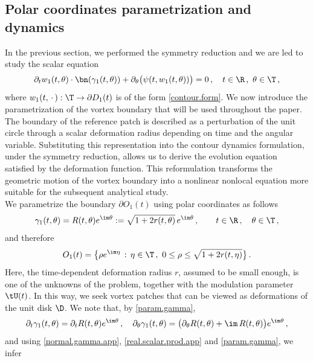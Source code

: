 \documentclass[a4paper,reqno,10pt]{article}
\newcommand{\pa}{\partial}
\begin{document}
\subsection{Polar coordinates parametrization and  dynamics}
In the previous section, we performed the symmetry reduction and we are led to study the scalar equation
\begin{equation}\label{contour.dyn.only1}
	\pa_{t} w_{1}(t,\theta) \cdot \bn(\gamma_{1}(t,\theta))  + \pa_{\theta} \big( \psi(t,w_{1}(t,\theta)) \big) =0 \,, \quad t\in \R\,, \ \theta\in \T\,,
\end{equation}
where $w_{1}(t,\,\cdot\,):\T\to \pa D_1(t)$ is of the form \eqref{contour.form}.
We now introduce the parametrization of the vortex boundary that will be used throughout the paper. The boundary of the reference patch is described as a perturbation of the unit circle through a scalar deformation radius depending on time and the angular variable. Substituting this representation into the contour dynamics formulation, under the symmetry reduction,  allows us to derive the evolution equation satisfied by the deformation function. This reformulation transforms the geometric motion of the vortex boundary into a nonlinear nonlocal equation more suitable for the subsequent analytical study.
\\
We parametrize the boundary $\partial O_1(t)$ using polar coordinates as follows
\begin{equation}\label{param.gamma}
	\gamma_{1}(t,\theta) = R(t,\theta) e^{\im\theta} := \sqrt{1+ 2 r(t,\theta)}\, e^{\im\theta} \,, \qquad t\in \R\,, \quad \theta \in \T\,,
\end{equation}
and therefore
\begin{equation*}
	O_1(t)=\big\{ \rho e^{\im\eta} \,: \, \eta \in \T\,, \ 0\leq \rho \leq \sqrt{1+2r(t,\eta)} \big\}\,.
\end{equation*}
Here,  the time-dependent deformation radius $ r$, assumed to be small enough, is one of the unknowns of the problem, together with the modulation parameter $\tU(t)$. In this way, we seek vortex patches that can be viewed as deformations of the unit disk $\D$.
We note that, by \eqref{param.gamma}, 
\begin{equation}
	\pa_{t} \gamma_{1}(t,\theta) = \pa_{t}R(t,\theta) e^{\im\theta} \,, \quad \pa_{\theta}\gamma_{1}(t,\theta) = \big( \pa_{\theta}R(t,\theta) +\im\,R(t,\theta) \big)e^{\im\theta}\,,
\end{equation}
and using  \eqref{normal.gamma.app}, \eqref{real.scalar.prod.app} and \eqref{param.gamma}, we infer
\end{document}
